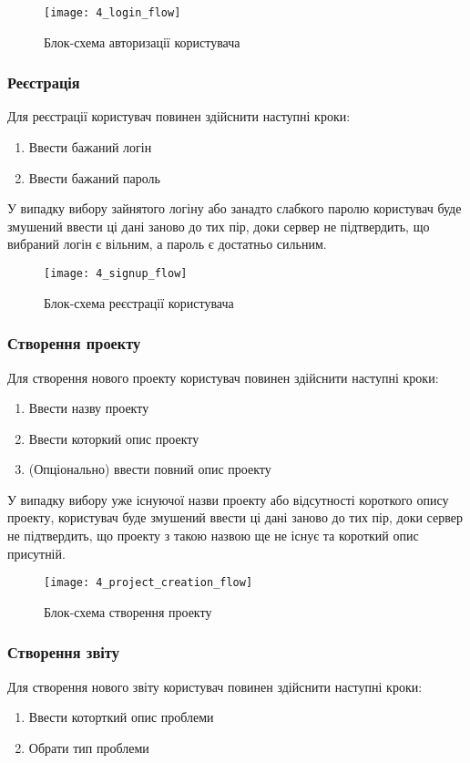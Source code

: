 \documentclass[../main.tex]{subfiles}
\begin{document}
\begin{figure}[H]
	\centering
	\texttt{[image: 4\_login\_flow]}
	\caption{Блок-схема авторизації користувача}
\end{figure}

\subsubsection{Реєстрація}
Для реєстрації користувач повинен здійснити наступні кроки:
\begin{enumerate}
	\item Ввести бажаний логін
	\item Ввести бажаний пароль
\end{enumerate}

У випадку вибору зайнятого логіну або занадто слабкого паролю користувач буде змушений ввести ці дані заново до тих пір, доки сервер не підтвердить, що вибраний логін є вільним, а пароль є достатньо сильним.

\begin{figure}[H]
	\centering
	\texttt{[image: 4\_signup\_flow]}
	\caption{Блок-схема реєстрації користувача}
\end{figure}

\subsubsection{Створення проекту}
Для створення нового проекту користувач повинен здійснити наступні кроки:
\begin{enumerate}
	\item Ввести назву проекту
	\item Ввести которкий опис проекту
	\item (Опціонально) ввести повний опис проекту
\end{enumerate}

У випадку вибору уже існуючої назви проекту або відсутності короткого опису проекту, користувач буде змушений ввести ці дані заново до тих пір, доки сервер не підтвердить, що проекту з такою назвою ще не існує та короткий опис присутній.

\begin{figure}[H]
	\centering
	\texttt{[image: 4\_project\_creation\_flow]}
	\caption{Блок-схема створення проекту}
\end{figure}

\subsubsection{Створення звіту}
Для створення нового звіту користувач повинен здійснити наступні кроки:
\begin{enumerate}
	\item Ввести которткий опис проблеми
	\item Обрати тип проблеми
\end{enumerate}
\end{document}
